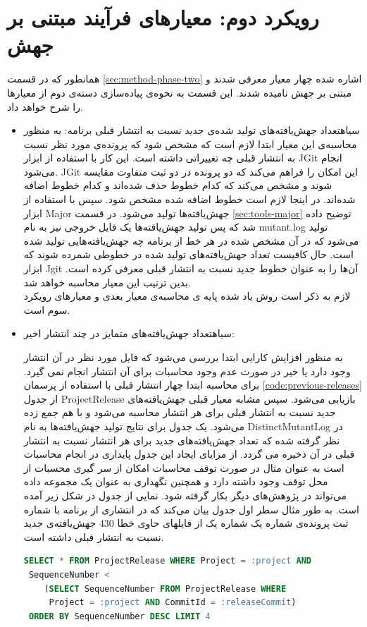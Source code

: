 \section{رویکرد دوم: معیارهای فرآیند مبتنی بر جهش}
همانطور که در قسمت \ref{sec:method-phase-two} اشاره شده چهار معیار معرفی شدند و مبتنی بر جهش نامیده شدند. این قسمت به نحوه‌ی پیاده‌سازی دسته‌ی دوم از معیارها را شرح خواهد داد. 
\begin{itemize}
\item
{}‌سیاه{تعداد جهش‌یافته‌های تولید شده‌ی جدید نسبت به انتشار قبلی برنامه:}
به منظور محاسبه‌ی این معیار ابتدا لازم است که مشخص شود که پرونده‌ی مورد نظر نسبت به انتشار قبلی چه تغییراتی داشته است. این کار با استفاده از ابزار JGit انجام  می‌شود. JGit این امکان را فراهم می‌کند که دو پرونده در دو ثبت متفاوت مقایسه شوند و مشخص می‌کند که کدام خطوط حذف شده‌اند و کدام خطوط اضافه شده‌اند. در اینجا لازم است خطوط اضافه شده  مشخص شود. سپس با استفاده از ابزار Major جهش‌یافته‌ها تولید می‌شود. در  قسمت  \ref{sec:tools-major} توضیح داده شد که پس تولید جهش‌یافته‌ها یک فایل خروجی نیز به نام mutant.log تولید می‌شود که در آن مشخص شده در هر خط از برنامه چه جهش‌یافته‌هایی تولید شده است. حال کافیست تعداد جهش‌یافته‌های تولید شده در خطوطی شمرده شوند که ابزار Jgit آن‌ها را به عنوان خطوط جدید نسبت به انتشار قبلی معرفی کرده است. بدین ترتیب این معیار محاسبه خواهد شد.\\
لازم به ذکر است روش یاد شده پایه ی محاسبه‌ی معیار بعدی و معیارهای رویکرد سوم است.
\item
{}‌سیاه{تعداد جهش‌یافته‌های متمایز در چند انتشار اخیر:}

 به منظور افزایش کارایی ابتدا بررسی می‌شود که فایل مورد نظر در آن انتشار وجود دارد یا خیر در صورت عدم وجود محاسبات برای آن انتشار انجام نمی گیرد.
برای محاسبه ابتدا چهار انتشار قبلی  با استفاده از پرسمان  \ref{code:previous-releases} از جدول ProjectRelease بازیابی می‌شود. سپس مشابه معیار قبلی جهش‌یافته‌های جدید نسبت به انتشار قبلی برای هر انتشار محاسبه می‌شود و با هم جمع زده می‌شود.  یک جدول برای نتایج تولید جهش‌یافته‌ها  به نام  DistinctMutantLog در نظر گرفته شده که تعداد جهش‌یافته‌های جدید برای هر انتشار نسبت به انتشار قبلی در آن ذخیره می گردد. از مزایای ایجاد این جدول پایداری در انجام محاسبات است به عنوان مثال  در صورت توقف محاسبات امکان از سر گیری محسبات از محل توقف وجود داشته دارد و همچنین  نگهداری به عنوان یک مجموعه داده می‌تواند در پژوهش‌های دیگر بکار گرفته شود. نمایی از جدول در شکل زیر آمده است. به طور مثال سطر اول جدول بیان می‌کند که در انتشاری از برنامه با شماره ثبت    پرونده‌ی شماره یک شماره یک از فایلهای حاوی خطا 430 جهش‌یافته‌ی جدید نسبت به انتشار قبلی داشته است.
\begin{latin}
	\begin{lstlisting}[language=SQL]
SELECT * FROM ProjectRelease WHERE Project = :project AND
 SequenceNumber <  
	(SELECT SequenceNumber FROM ProjectRelease WHERE 
	 Project = :project AND CommitId = :releaseCommit) 
 ORDER BY SequenceNumber DESC LIMIT 4 
\end{lstlisting}
\end{latin}
\label{code:previous-releases}


\end{itemize}
